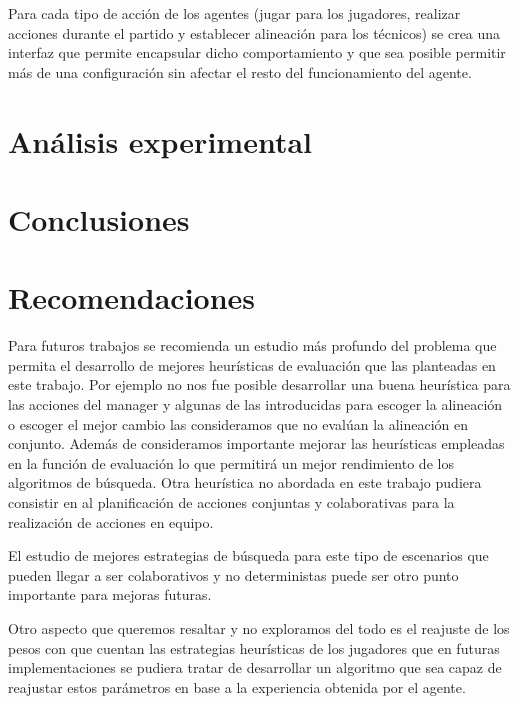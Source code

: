 \documentclass{article}
\begin{document}
Para cada tipo de acción de los agentes (jugar para los jugadores, realizar acciones durante el partido y establecer alineación para los
técnicos) se crea una interfaz que permite encapsular dicho comportamiento y que sea posible permitir más de una configuración sin afectar
el resto del funcionamiento del agente.

\section{Análisis experimental}

\section{Conclusiones}

\section{Recomendaciones}

Para futuros trabajos se recomienda un estudio más profundo del problema que permita el desarrollo de mejores heurísticas de evaluación
que las planteadas en este trabajo. Por ejemplo no nos fue posible desarrollar una buena heurística para las acciones del manager y algunas
de las introducidas para escoger la alineación o escoger el mejor cambio las consideramos que no evalúan la alineación en conjunto.
Además de consideramos importante mejorar las heurísticas empleadas en la función de evaluación lo que permitirá un mejor rendimiento 
de los algoritmos de búsqueda. Otra heurística no abordada en este trabajo pudiera consistir en al planificación de acciones conjuntas y 
colaborativas para la realización de acciones en equipo.

El estudio de mejores estrategias de búsqueda para este tipo de escenarios que pueden llegar a ser colaborativos y no deterministas puede
ser otro punto importante para mejoras futuras.

Otro aspecto que queremos resaltar y no exploramos del todo es el reajuste de los pesos con que cuentan las estrategias heurísticas de los jugadores
que en futuras implementaciones se pudiera tratar de desarrollar un algoritmo que sea capaz de reajustar estos parámetros en base a la experiencia
obtenida por el agente.
\end{document}
